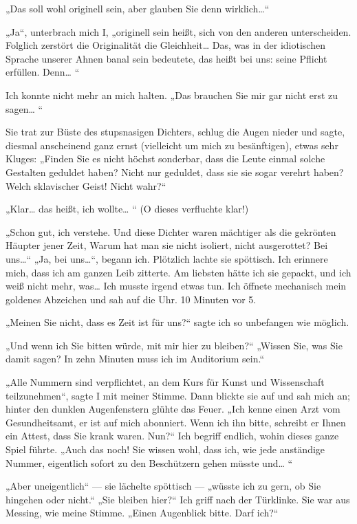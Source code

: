 „Das soll wohl originell sein, aber glauben Sie denn wirklich\ldots{}“

„Ja“, unterbrach mich I, „originell sein heißt, sich von den
anderen unterscheiden. Folglich zerstört die Originalität die
Gleichheit\ldots{} Das, was in der idiotischen Sprache unserer Ahnen
banal sein bedeutete, das heißt bei uns: seine Pflicht erfüllen.
Denn\ldots{} “

Ich konnte nicht mehr an mich halten. „Das brauchen Sie mir gar
nicht erst zu sagen\ldots{} “

Sie trat zur Büste des stupsnasigen Dichters, schlug die Augen
nieder und sagte, diesmal anscheinend ganz ernst (vielleicht um
mich zu besänftigen), etwas sehr Kluges: „Finden Sie es nicht
höchst sonderbar, dass die Leute einmal solche Gestalten geduldet
haben? Nicht nur geduldet, dass sie sie sogar verehrt haben? Welch
sklavischer Geist! Nicht wahr?“

„Klar\ldots{} das heißt, ich wollte\ldots{} “ (O dieses verfluchte klar!)

„Schon gut, ich verstehe. Und diese Dichter waren mächtiger als die
gekrönten Häupter jener Zeit, Warum hat man sie nicht isoliert,
nicht ausgerottet? Bei uns\ldots{}“ „Ja, bei uns\ldots{}“, begann ich.
Plötzlich lachte sie spöttisch. Ich erinnere mich, dass ich am
ganzen Leib zitterte. Am liebsten hätte ich sie gepackt, und ich
weiß nicht mehr, was\ldots{} Ich musste irgend etwas tun. Ich öffnete
mechanisch mein goldenes Abzeichen und sah auf die Uhr. 10 Minuten
vor 5.

„Meinen Sie nicht, dass es Zeit ist für uns?“ sagte ich so
unbefangen wie möglich.

„Und wenn ich Sie bitten würde, mit mir hier zu bleiben?“ „Wissen
Sie, was Sie damit sagen? In zehn Minuten muss ich im Auditorium
sein.“

„Alle Nummern sind verpflichtet, an dem Kurs für Kunst und
Wissenschaft teilzunehmen“, sagte I mit meiner Stimme. Dann blickte
sie auf und sah mich an; hinter den dunklen Augenfenstern glühte
das Feuer. „Ich kenne einen Arzt vom Gesundheitsamt, er ist auf
mich abonniert. Wenn ich ihn bitte, schreibt er Ihnen ein Attest,
dass Sie krank waren. Nun?“ Ich begriff endlich, wohin dieses ganze
Spiel führte. „Auch das noch! Sie wissen wohl, dass ich, wie jede
anständige Nummer, eigentlich sofort zu den Beschützern gehen
müsste und\ldots{} “

„Aber uneigentlich“ — sie lächelte spöttisch — „wüsste ich zu gern,
ob Sie hingehen oder nicht.“ „Sie bleiben hier?“ Ich griff nach der
Türklinke. Sie war aus Messing, wie meine Stimme. „Einen Augenblick
bitte. Darf ich?“

